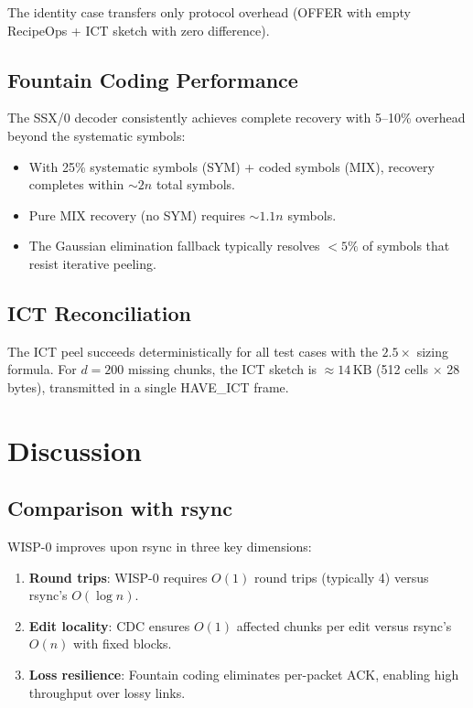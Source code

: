 \documentclass[11pt,twocolumn]{article}
\theoremstyle{definition}
\begin{document}
The identity case transfers only protocol overhead (OFFER with empty
RecipeOps + ICT sketch with zero difference).

\subsection{Fountain Coding Performance}

The SSX/0 decoder consistently achieves complete recovery with
5--10\% overhead beyond the systematic symbols:

\begin{itemize}
  \item With 25\% systematic symbols (SYM) + coded symbols (MIX),
    recovery completes within $\sim 2n$ total symbols.
  \item Pure MIX recovery (no SYM) requires $\sim 1.1n$ symbols.
  \item The Gaussian elimination fallback typically resolves
    $< 5\%$ of symbols that resist iterative peeling.
\end{itemize}

\subsection{ICT Reconciliation}

The ICT peel succeeds deterministically for all test cases with the
$2.5\times$ sizing formula. For $d = 200$ missing chunks, the ICT
sketch is $\approx 14\,\text{KB}$ (512 cells $\times$ 28 bytes),
transmitted in a single HAVE\_ICT frame.


\section{Discussion}
\label{sec:discussion}

\subsection{Comparison with rsync}

WISP-0 improves upon rsync in three key dimensions:

\begin{enumerate}
  \item \textbf{Round trips}: WISP-0 requires $O(1)$ round trips
    (typically 4) versus rsync's $O(\log n)$.
  \item \textbf{Edit locality}: CDC ensures $O(1)$ affected chunks
    per edit versus rsync's $O(n)$ with fixed blocks.
  \item \textbf{Loss resilience}: Fountain coding eliminates
    per-packet ACK, enabling high throughput over lossy links.
\end{enumerate}
\end{document}

